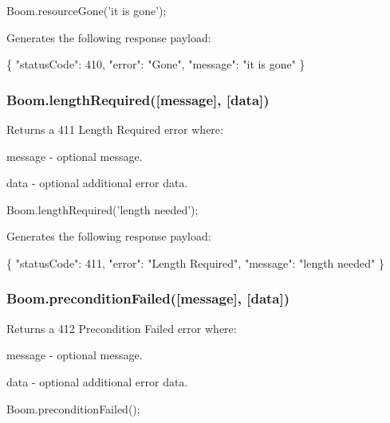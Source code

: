 \begin{DoxyCode}
Boom.resourceGone('it is gone');
\end{DoxyCode}


Generates the following response payload\+:


\begin{DoxyCode}
\{
    "statusCode": 410,
    "error": "Gone",
    "message": "it is gone"
\}
\end{DoxyCode}


\subsubsection*{{\ttfamily Boom.\+length\+Required(\mbox{[}message\mbox{]}, \mbox{[}data\mbox{]})}}

Returns a 411 Length Required error where\+:
\begin{DoxyItemize}
\item {\ttfamily message} -\/ optional message.
\item {\ttfamily data} -\/ optional additional error data.
\end{DoxyItemize}


\begin{DoxyCode}
Boom.lengthRequired('length needed');
\end{DoxyCode}


Generates the following response payload\+:


\begin{DoxyCode}
\{
    "statusCode": 411,
    "error": "Length Required",
    "message": "length needed"
\}
\end{DoxyCode}


\subsubsection*{{\ttfamily Boom.\+precondition\+Failed(\mbox{[}message\mbox{]}, \mbox{[}data\mbox{]})}}

Returns a 412 Precondition Failed error where\+:
\begin{DoxyItemize}
\item {\ttfamily message} -\/ optional message.
\item {\ttfamily data} -\/ optional additional error data.
\end{DoxyItemize}


\begin{DoxyCode}
Boom.preconditionFailed();
\end{DoxyCode}


